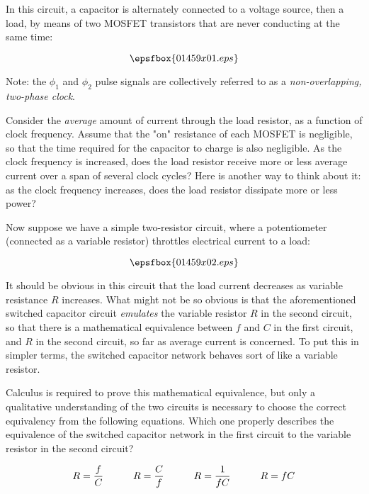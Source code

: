 

In this circuit, a capacitor is alternately connected to a voltage source, then a load, by means of two MOSFET transistors that are never conducting at the same time:

$$\epsfbox{01459x01.eps}$$

Note: the $\phi_1$ and $\phi_2$ pulse signals are collectively referred to as a {\it non-overlapping, two-phase clock}.

Consider the {\it average} amount of current through the load resistor, as a function of clock frequency.  Assume that the "on" resistance of each MOSFET is negligible, so that the time required for the capacitor to charge is also negligible.  As the clock frequency is increased, does the load resistor receive more or less average current over a span of several clock cycles?  Here is another way to think about it: as the clock frequency increases, does the load resistor dissipate more or less power? 

\vskip 10pt

Now suppose we have a simple two-resistor circuit, where a potentiometer (connected as a variable resistor) throttles electrical current to a load:

$$\epsfbox{01459x02.eps}$$

It should be obvious in this circuit that the load current decreases as variable resistance $R$ increases.  What might not be so obvious is that the aforementioned switched capacitor circuit {\it emulates} the variable resistor $R$ in the second circuit, so that there is a mathematical equivalence between $f$ and $C$ in the first circuit, and $R$ in the second circuit, so far as average current is concerned.  To put this in simpler terms, the switched capacitor network behaves sort of like a variable resistor.

Calculus is required to prove this mathematical equivalence, but only a qualitative understanding of the two circuits is necessary to choose the correct equivalency from the following equations.  Which one properly describes the equivalence of the switched capacitor network in the first circuit to the variable resistor in the second circuit?

$$R = {f \over C} \hskip 30pt R = {C \over f} \hskip 30pt R = {1 \over fC} \hskip 30pt R = fC$$

